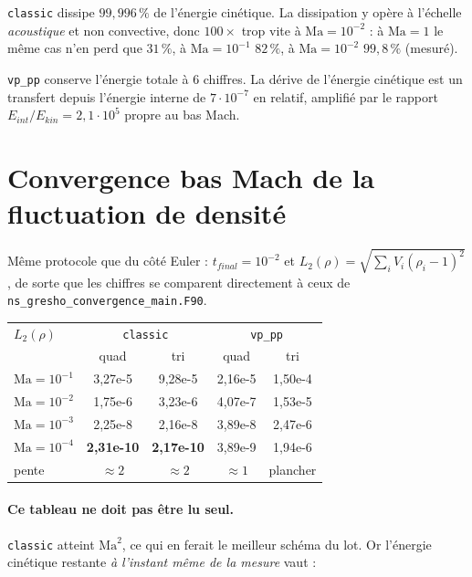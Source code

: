 \documentclass[11pt,a4paper]{article}
\begin{document}
\noindent
\texttt{classic} dissipe $99{,}996\,\%$ de l'énergie cinétique. La dissipation y opère à
l'échelle \emph{acoustique} et non convective, donc $100\times$ trop vite à
$\mathrm{Ma}=10^{-2}$ : à $\mathrm{Ma}=1$ le même cas n'en perd que $31\,\%$, à
$\mathrm{Ma}=10^{-1}$ $82\,\%$, à $\mathrm{Ma}=10^{-2}$ $99{,}8\,\%$ (mesuré).

\medskip
\noindent
\texttt{vp\_pp} conserve l'énergie totale à 6 chiffres. La dérive de l'énergie
cinétique est un transfert depuis l'énergie interne de $7\cdot10^{-7}$ en relatif,
amplifié par le rapport $E_{int}/E_{kin}=2{,}1\cdot10^5$ propre au bas Mach.

\section*{Convergence bas Mach de la fluctuation de densité}

Même protocole que du côté Euler : $t_{final}=10^{-2}$ et
$L_2(\rho)=\sqrt{\sum_i V_i(\rho_i-1)^2}$, de sorte que les chiffres se comparent
directement à ceux de \texttt{ns\_gresho\_convergence\_main.F90}.

\begin{table}[H]\centering
\begin{tabular}{lcccc}
\toprule
$L_2(\rho)$ & \multicolumn{2}{c}{\texttt{classic}} & \multicolumn{2}{c}{\texttt{vp\_pp}} \\
 & quad & tri & quad & tri \\
\midrule
$\mathrm{Ma}=10^{-1}$ & 3{,}27e-5 & 9{,}28e-5 & 2{,}16e-5 & 1{,}50e-4 \\
$\mathrm{Ma}=10^{-2}$ & 1{,}75e-6 & 3{,}23e-6 & 4{,}07e-7 & 1{,}53e-5 \\
$\mathrm{Ma}=10^{-3}$ & 2{,}25e-8 & 2{,}16e-8 & 3{,}89e-8 & 2{,}47e-6 \\
$\mathrm{Ma}=10^{-4}$ & \textbf{2{,}31e-10} & \textbf{2{,}17e-10} & 3{,}89e-9 & 1{,}94e-6 \\
\midrule
pente & $\approx2$ & $\approx2$ & $\approx1$ & plancher \\
\bottomrule
\end{tabular}
\end{table}

\paragraph{Ce tableau ne doit pas être lu seul.} \texttt{classic} atteint
$\mathrm{Ma}^2$, ce qui en ferait le meilleur schéma du lot. Or l'énergie cinétique
restante \emph{à l'instant même de la mesure} vaut :
\end{document}
